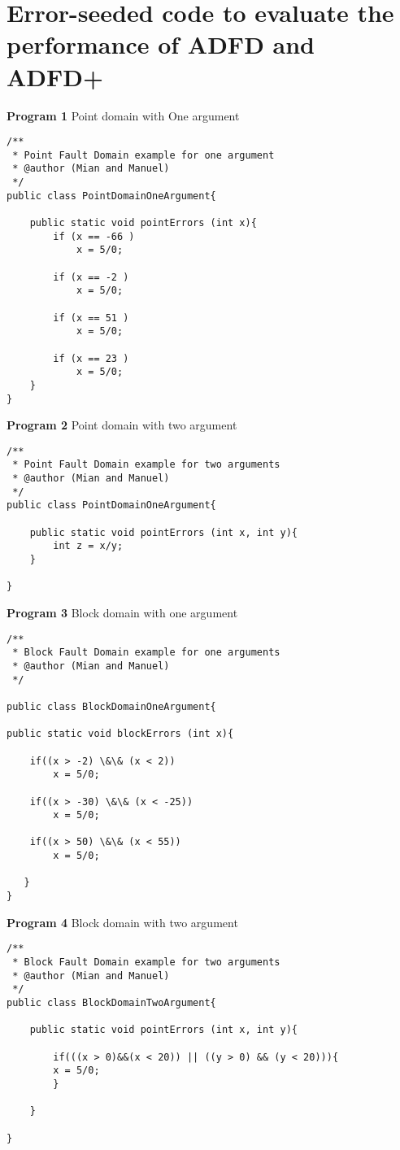 \section{Error-seeded code to evaluate the performance of ADFD and ADFD+}
\textbf{Program 1} Point domain with One argument
\begin{lstlisting} 
/**
 * Point Fault Domain example for one argument
 * @author (Mian and Manuel)
 */
public class PointDomainOneArgument{

	public static void pointErrors (int x){
		if (x == -66 )
			x = 5/0;

		if (x == -2 )
			x = 5/0;

		if (x == 51 )
			x = 5/0;

		if (x == 23 )
			x = 5/0;
	}
}
\end{lstlisting}
\textbf{Program 2} Point domain with two argument
\begin{lstlisting}
/**
 * Point Fault Domain example for two arguments
 * @author (Mian and Manuel)
 */
public class PointDomainOneArgument{

	public static void pointErrors (int x, int y){
		int z = x/y;
	}

}
\end{lstlisting}

\textbf{Program 3} Block domain with one argument
\begin{lstlisting}
/**
 * Block Fault Domain example for one arguments
 * @author (Mian and Manuel)
 */

public class BlockDomainOneArgument{

public static void blockErrors (int x){
	
	if((x > -2) \&\& (x < 2))
		x = 5/0;
	
	if((x > -30) \&\& (x < -25))
		x = 5/0;
	
	if((x > 50) \&\& (x < 55))
		x = 5/0;

   }
}

\end{lstlisting}
\textbf{Program 4} Block domain with two argument
\begin{lstlisting}
/**
 * Block Fault Domain example for two arguments
 * @author (Mian and Manuel)
 */
public class BlockDomainTwoArgument{

	public static void pointErrors (int x, int y){

		if(((x > 0)&&(x < 20)) || ((y > 0) && (y < 20))){
		x = 5/0;
		}
  	
	}

}
\end{lstlisting}

